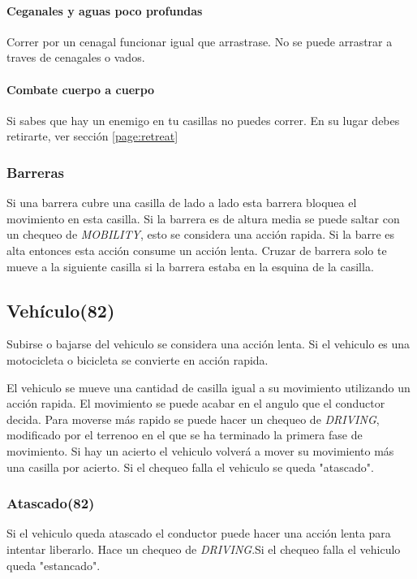         \paragraph{Ceganales y aguas poco profundas}
        Correr por un cenagal funcionar igual que arrastrase. No se puede arrastrar a traves de cenagales o vados.

        \paragraph{Combate cuerpo a cuerpo}
        Si sabes que hay un enemigo en tu casillas no puedes correr. En su lugar debes retirarte, ver sección \ref{page:retreat}

        \subsubsection{Barreras}
        Si una barrera cubre una casilla de lado a lado esta barrera bloquea el movimiento en esta casilla.
        Si la barrera es de altura media se puede saltar con un chequeo de \emph{MOBILITY}, esto se considera una acción rapida. Si la barre es alta entonces esta acción consume un acción lenta. Cruzar de barrera solo te mueve a la siguiente casilla si la barrera estaba en la esquina de la casilla.

    \subsection{Vehículo(82)}

    Subirse o bajarse del vehiculo se considera una acción lenta. Si el vehiculo es una motocicleta o bicicleta se convierte en acción rapida.

    El vehiculo se mueve una cantidad de casilla igual a su movimiento utilizando un acción rapida. El movimiento se puede acabar en el angulo que el conductor decida. Para moverse más rapido se puede hacer un chequeo de \emph{DRIVING}, modificado por el terrenoo en el que se ha terminado la primera fase de movimiento. Si hay un acierto el vehiculo volverá a mover su movimiento más una casilla por acierto. Si el chequeo falla el vehiculo se queda "atascado".

        \subsubsection{Atascado(82)}
        Si el vehiculo queda atascado el conductor puede hacer una acción lenta para intentar liberarlo. Hace un chequeo de \emph{DRIVING}.Si el chequeo falla el vehiculo queda "estancado".

